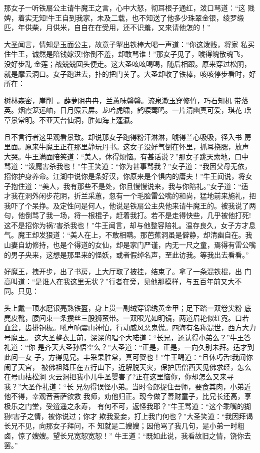 那女子一听铁扇公主请牛魔王之言，心中大怒，彻耳根子通红，泼口骂道：“这
贱婢，着实无知!牛王自到我家，未及二载，也不知送了他多少珠翠金银，绫罗缎
匹，年供柴，月供米，自自在在受用，还不识羞，又来请他怎的！”

大圣闻言，情知是玉面公主，故意子掣出铁棒大喝一声道：“你这泼贱，将家
私买住牛王，诚然是陪钱嫁汉!你倒不羞，却敢骂谁！”那女子见了，唬得魄散魂飞，
没好步乱金莲；战兢兢回头便走。这大圣吆吆喝喝，随后相跟。原来穿过松阴，
就是摩云洞口。女子跑进去，扑的把门关了。大圣却收了铁棒，咳咳停步看时，好
所在：

树林森密，崖削。薜萝阴冉冉，兰蕙味馨馨。流泉漱玉穿修竹，巧石知机
带落英。烟霞笼远岫，日月照云屏。龙吟虎啸，鹤唳莺鸣。一片清幽真可爱，琪花
瑶草景常明。不亚天台仙洞，胜如海上蓬瀛。

且不言行者这里观看景致。却说那女子跑得粉汗淋淋，唬得兰心吸吸，径入书
房里面。原来牛魔王正在那里静玩丹书。这女子没好气倒在怀里，抓耳挠腮，放声
大哭。牛王满面陪笑道：“美人，休得烦恼。有甚话说？”那女子跳天索地，口中
骂道：“泼魔害杀我也！”牛王笑道：“你为甚事骂我？”女子道：“我因父母无依，
招你护身养命。江湖中说你是条好汉，你原来是个惧内的庸夫！”牛王闻说，将女
子抱住道：“美人，我有那些不是处，你且慢慢说来，我与你陪礼。”女子道：“适
才我在洞外闲步花阴，折兰采蕙，忽有一个毛脸雷公嘴的和尚，猛地前来施礼，把
我吓了个呆挣。及定性问是何人，他说是铁扇公主央他来请牛魔王的。被我说了两
句，他倒骂了我一场，将一根棍子，赶着我打。若不是走得快些，几乎被他打死!
这不是招你为祸?害杀我也！”牛王闻言，却与他整容陪礼。温存良久，女子方才息
气。魔王却发狠道：“美人在上，不敢相瞒。那芭蕉洞虽是僻静，却清幽自在。我
山妻自幼修持，也是个得道的女仙，却是家门严谨，内无一尺之童，焉得有雷公嘴
的男子央来，这想是那里来的怪妖，或者假绰名声，至此访我。等我出去看看。”

好魔王，拽开步，出了书房，上大厅取了披挂，结束了。拿了一条混铁棍，出
门高叫道：“是谁人在我这里无状？”行者在旁，见他那模样，与五百年前又大不
同。只见：

头上戴一顶水磨银亮熟铁盔，身上贯一副绒穿锦绣黄金甲；足下踏一双卷尖粉
底麂皮靴，腰间束一条攒丝三股狮蛮带。一双眼光如明镜，两道眉艳似红霓。口若
血盆，齿排铜板。吼声响震山神怕，行动威风恶鬼慌。四海有名称混世，西方大力
号魔王。
这大圣整衣上前，深深的唱个大喏道：“长兄，还认得小弟么？”牛王答礼道：“你
是齐天大圣孙悟空么？”大圣道：“正是，正是，一向久别未拜。适才到此问一女
子，方得见兄。丰采果胜常，真可贺也！”牛王喝道：“且休巧舌!我闻你闹了天宫，
被佛祖降压在五行山下，近解脱天灾，保护唐僧西天见佛求经，怎么在号山枯松涧
火云洞把我小儿牛圣婴害了?正在这里恼你，你却怎么又来寻我？”大圣作礼道：“长
兄勿得误怪小弟。当时令郎捉住吾师，要食其肉，小弟近他不得，幸观音菩萨欲救
我师，劝他归正。现今做了善财童子，比兄长还高，享极乐之门堂，受逍遥之永寿，
有何不可，返怪我耶？”牛王骂道：“这个乖嘴的猢狲!害子之情，被你说过；你才
欺我爱妾，打上我门何也？”大圣笑道：“我因拜谒长兄不见，向那女子拜问，不
知就是二嫂嫂；因他骂了我几句，是小弟一时粗卤，惊了嫂嫂。望长兄宽恕宽恕！”
牛王道：“既如此说，我看故旧之情，饶你去罢。”

